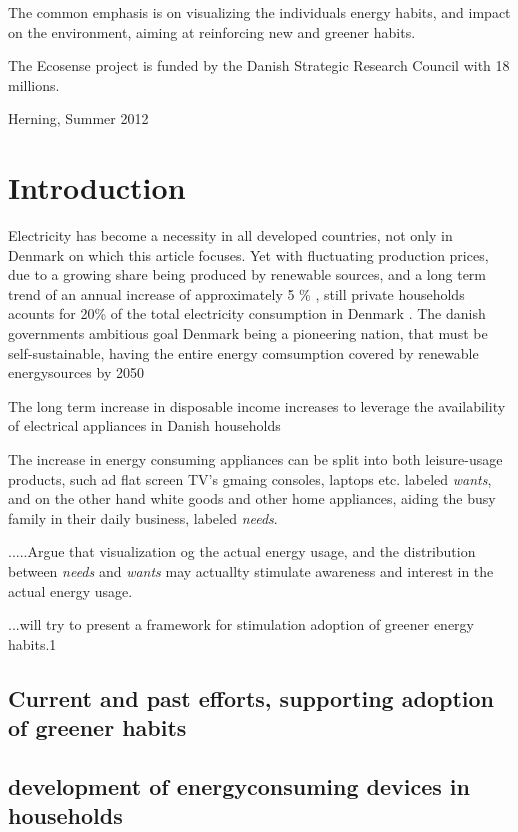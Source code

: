 \documentclass[conference]{IEEEtran}
\begin{document}
The common emphasis is on visualizing the individuals energy habits, and impact on the environment, aiming at reinforcing new and greener habits. 

The Ecosense project is funded by the Danish Strategic Research Council with 18 millions.
 
\hfill Herning, Summer 2012

\section{Introduction}
Electricity has become a necessity in all developed countries, not only in Denmark on which this article focuses. Yet with fluctuating production prices, due to a growing share being produced by renewable sources, and a long term trend of an annual increase of approximately 5 \% \cite{udv_elpriser}, still private households acounts for 20\% of the total electricity consumption in Denmark \cite{energistat}.
The danish governments ambitious goal Denmark being a pioneering nation, that must be self-sustainable, having the entire energy comsumption covered by renewable energysources by 2050 \cite{energipolitik_2020} 

The long term increase in disposable income increases to leverage the availability of electrical appliances in Danish households %

The increase in energy consuming appliances can be split into both leisure-usage products, such ad flat screen TV's gmaing consoles, laptops etc. labeled \textit{wants}, and on the other hand white goods and other home appliances, aiding the busy family in their daily business, labeled \textit{needs}.

.....Argue that visualization og the actual energy usage, and the distribution between \textit{needs} and \textit{wants} may actuallty stimulate awareness and interest in the actual energy usage.

...will try to present a framework for stimulation adoption of greener energy habits.1




\subsection{Current and past efforts, supporting adoption of greener habits}

\subsection{development of energyconsuming devices in households}
\end{document}
